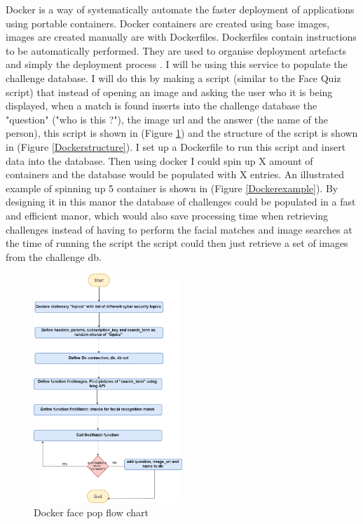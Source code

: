 \documentclass[12pt,a4paper]{article}
\begin{document}
Docker is a way of systematically automate the faster deployment of applications using portable containers. Docker containers are created using base images, images are created manually are with Dockerfiles. Dockerfiles contain instructions to be automatically performed. They are used to organise deployment artefacts and simply the deployment process \cite{bernstein2014containers}. I will be using this service to populate the challenge database. I will do this by making a script (similar to the Face Quiz script) that instead of opening an image and asking the user who it is being displayed, when a match is found inserts into the challenge database the "question" ("who is this ?"), the image url and the answer (the name of the person), this script is shown in (Figure \ref{DockerFace}) and the structure of the script is shown in (Figure \ref{Dockerstructure}). I set up a Dockerfile to run this script and insert data into the database. Then using docker I could spin up X amount of containers and the database would be populated with X entries. An illustrated example of spinning up 5 container is shown in (Figure \ref{Dockerexample}). By designing it in this manor the database of challenges could be populated in a fast and efficient manor, which would also save processing time when retrieving challenges instead of having to perform the facial matches and image searches at the time of running the script the script could then just retrieve a set of images from the challenge db.
 


\begin{figure}[h]
    \centering
    \includegraphics[width=0.5\textwidth]{Figs/Docker_face_pop.png} 
    \caption{Docker face pop flow chart} 
    \label{DockerFace}
\end{figure}     
\end{document}
